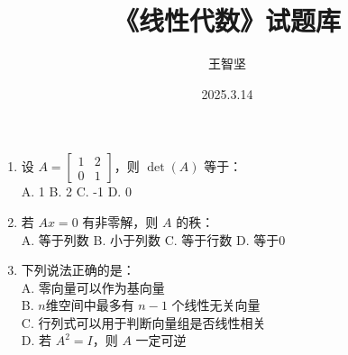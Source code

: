 \documentclass[12pt]{ctexart}
\title{《线性代数》试题库}
\author{王智坚}
\date{2025.3.14}
\begin{document}
\begin{enumerate}
	\item 设 $A=\begin{bmatrix}1 & 2 \\ 0 & 1\end{bmatrix}$，则 $\det(A)$ 等于：\\
	A. 1 \quad B. 2 \quad C. -1 \quad D. 0
	
	\item 若 $Ax = 0$ 有非零解，则 $A$ 的秩：\\
	A. 等于列数 \quad B. 小于列数 \quad C. 等于行数 \quad D. 等于0
	
	\item 下列说法正确的是：\\
	A. 零向量可以作为基向量 \\
	B. $n$维空间中最多有 $n-1$ 个线性无关向量 \\
	C. 行列式可以用于判断向量组是否线性相关 \\
	D. 若 $A^2 = I$，则 $A$ 一定可逆
\end{enumerate}
\end{document}
